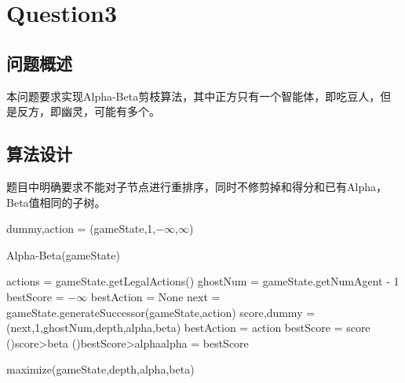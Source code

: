 \chapter{Question3}
\section{问题概述}
%
%
本问题要求实现Alpha-Beta剪枝算法，其中正方只有一个智能体，即吃豆人，但是反方，即幽灵，可能有多个。
%
%
%
%
\section{算法设计}
%
%
题目中明确要求不能对子节点进行重排序，同时不修剪掉和得分和已有Alpha，Beta值相同的子树。

\begin{algorithm}[h]
    dummy,action = \maximize(gameState,1,$-\infty$,$\infty$)\;
    \caption{Alpha-Beta(gameState)}
\end{algorithm}

\begin{procedure}[h]
    \;
    actions = gameState.getLegalActions()\;
    ghostNum = gameState.getNumAgent - 1\;
    {}
    bestScore = $-\infty$\;
    bestAction = None\;
    {
        next = gameState.generateSuccessor(gameState,action)\;
        score,dummy = \minimize(next,1,ghostNum,depth,alpha,beta)\;
        {
            bestAction = action\;
            bestScore = score\;
        }
        \lIf(){score>beta}{}
        \lIf(){bestScore>alpha}{alpha = bestScore}
    }
    \caption{maximize(gameState,depth,alpha,beta)}
\end{procedure}

